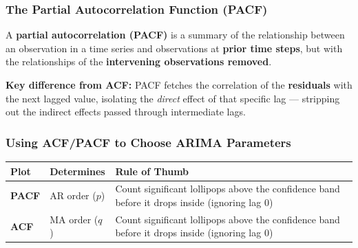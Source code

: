 \documentclass[12pt,openany]{book}
\begin{document}
\subsubsection{The Partial Autocorrelation Function (PACF)}

A \textbf{partial autocorrelation (PACF)} is a summary of the relationship between an observation in a time series and observations at \textbf{prior time steps}, but with the relationships of the \textbf{intervening observations removed}.

\textbf{Key difference from ACF:} PACF fetches the correlation of the \textbf{residuals} with the next lagged value, isolating the \textit{direct} effect of that specific lag --- stripping out the indirect effects passed through intermediate lags.


\begin{center}
\end{center}


\subsubsection{Using ACF/PACF to Choose ARIMA Parameters}

\begin{center}
\begin{tabular}{|L{0.22\textwidth}|L{0.32\textwidth}|L{0.32\textwidth}|}
\hline
Plot & Determines & Rule of Thumb \\
\hline
\textbf{PACF} & AR order (\(p\)) & Count significant lollipops above the confidence band before it drops inside (ignoring lag 0) \\
\hline
\textbf{ACF} & MA order (\(q\)) & Count significant lollipops above the confidence band before it drops inside (ignoring lag 0) \\
\hline
\end{tabular}
\end{center}
\end{document}
